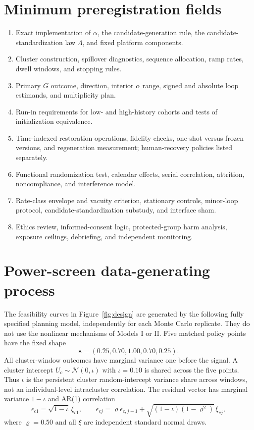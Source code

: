 \documentclass[10pt,a4paper]{article}
\begin{document}
\begin{appendices}
\section{Minimum preregistration fields}

\begin{enumerate}
  \item Exact implementation of $\alpha$, the candidate-generation rule, the candidate-standardization law $\Lambda$, and fixed platform components.
  \item Cluster construction, spillover diagnostics, sequence allocation, ramp rates, dwell windows, and stopping rules.
  \item Primary $G$ outcome, direction, interior $\alpha$ range, signed and absolute loop estimands, and multiplicity plan.
  \item Run-in requirements for low- and high-history cohorts and tests of initialization equivalence.
  \item Time-indexed restoration operations, fidelity checks, one-shot versus frozen versions, and regeneration measurement; human-recovery policies listed separately.
  \item Functional randomization test, calendar effects, serial correlation, attrition, noncompliance, and interference model.
  \item Rate-class envelope and vacuity criterion, stationary controls, minor-loop protocol, candidate-standardization substudy, and interface sham.
  \item Ethics review, informed-consent logic, protected-group harm analysis, exposure ceilings, debriefing, and independent monitoring.
\end{enumerate}

\section{Power-screen data-generating process}
\label{app:power-dgp}

The feasibility curves in Figure~\ref{fig:design} are generated by the following fully specified planning model, independently for each Monte Carlo replicate. They do not use the nonlinear mechanisms of Models I or II. Five matched policy points have the fixed shape
\begin{equation}
\bm s=(0.25,0.70,1.00,0.70,0.25).
\end{equation}
All cluster-window outcomes have marginal variance one before the signal. A cluster intercept $U_c\sim\mathcal N(0,\iota)$ with $\iota=0.10$ is shared across the five points. Thus $\iota$ is the persistent cluster random-intercept variance share across windows, not an individual-level intracluster correlation. The residual vector has marginal variance $1-\iota$ and AR(1) correlation
\begin{equation}
\epsilon_{c1}=\sqrt{1-\iota}\,\xi_{c1},\qquad
\epsilon_{cj}=\varrho\epsilon_{c,j-1}
+\sqrt{(1-\iota)(1-\varrho^2)}\,\xi_{cj},
\end{equation}
where $\varrho=0.50$ and all $\xi$ are independent standard normal draws.


\end{appendices}
\end{document}
